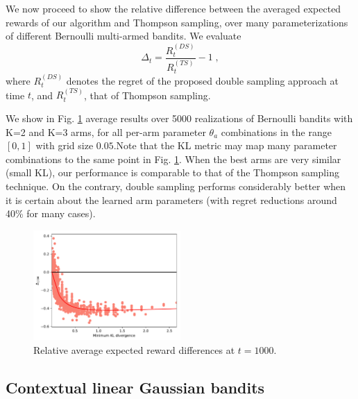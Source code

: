 \documentclass{article}
\begin{document}
We now proceed to show the relative difference between the averaged expected rewards of our algorithm and Thompson sampling, over many parameterizations of different Bernoulli multi-armed bandits. We evaluate
\begin{equation}
\Delta_t =\frac{R_{t}^{(DS)}}{R_{t}^{(TS)}}-1 \; ,
\end{equation}
where $R_t^{(DS)}$ denotes the regret of the proposed double sampling approach at time $t$, and $R_t^{(TS)}$, that of Thompson sampling.

We show in Fig. \ref{fig:bernoulli_relative_cumregret_kl} average results over 5000 realizations of Bernoulli bandits with K=2 and K=3 arms, for all per-arm parameter $\theta_a$ combinations in the range $[0,1]$ with grid size $0.05$.Note that the KL metric may map many parameter combinations to the same point in Fig. \ref{fig:bernoulli_relative_cumregret_kl}.  When the best arms are very similar (small KL), our performance is comparable to that of the Thompson sampling technique. On the contrary, double sampling performs considerably better when it is certain about the learned arm parameters (with regret reductions around 40\% for many cases).

\begin{figure}[!h]
	\centering
	\includegraphics[width=0.5\textwidth]{./figs/bernoulli/min_KL_relDiff_t1000_07.pdf}
	\caption{Relative average expected reward differences at $t=1000$.}
	\label{fig:bernoulli_relative_cumregret_kl}
\end{figure}

\subsection{Contextual linear Gaussian bandits}
\label{ssec:contextLinearGaussian_bandits}
\end{document}
